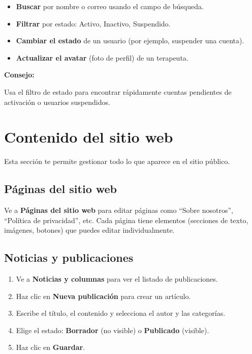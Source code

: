 \documentclass[12pt,a4paper]{article}
\newenvironment{consejo}{%
  \begin{mdframed}[backgroundcolor=grayLight,linecolor=primaryColor,linewidth=1.5pt,innerleftmargin=10pt]
  \textcolor{primaryColor}{\textbf{Consejo:}} 
}{%
  \end{mdframed}
}
\begin{document}
\begin{itemize}
  \item \textbf{Buscar} por nombre o correo usando el campo de búsqueda.
  \item \textbf{Filtrar} por estado: Activo, Inactivo, Suspendido.
  \item \textbf{Cambiar el estado} de un usuario (por ejemplo, suspender una cuenta).
  \item \textbf{Actualizar el avatar} (foto de perfil) de un terapeuta.
\end{itemize}

\begin{consejo}
  Usa el filtro de estado para encontrar rápidamente cuentas pendientes
  de activación o usuarios suspendidos.
\end{consejo}

\section{Contenido del sitio web}

Esta sección te permite gestionar todo lo que aparece en el sitio público.

\subsection{Páginas del sitio web}

Ve a \textbf{Páginas del sitio web} para editar páginas como ``Sobre nosotros'',
``Política de privacidad'', etc. Cada página tiene elementos (secciones de texto,
imágenes, botones) que puedes editar individualmente.

\subsection{Noticias y publicaciones}

\begin{enumerate}
  \item Ve a \textbf{Noticias y columnas} para ver el listado de publicaciones.
  \item Haz clic en \textbf{Nueva publicación} para crear un artículo.
  \item Escribe el título, el contenido y selecciona el autor y las categorías.
  \item Elige el estado: \textbf{Borrador} (no visible) o \textbf{Publicado} (visible).
  \item Haz clic en \textbf{Guardar}.
\end{enumerate}
\end{document}
